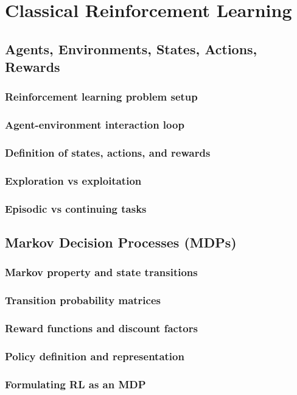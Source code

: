 ﻿\chapter{Classical Reinforcement Learning}
\section{Agents, Environments, States, Actions, Rewards}
\subsection{Reinforcement learning problem setup}
\subsection{Agent-environment interaction loop}
\subsection{Definition of states, actions, and rewards}
\subsection{Exploration vs exploitation}
\subsection{Episodic vs continuing tasks}

\section{Markov Decision Processes (MDPs)}
\subsection{Markov property and state transitions}
\subsection{Transition probability matrices}
\subsection{Reward functions and discount factors}
\subsection{Policy definition and representation}
\subsection{Formulating RL as an MDP}

